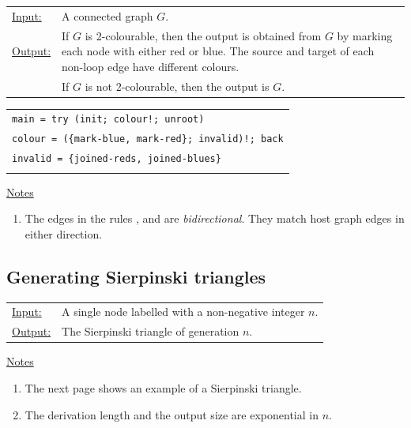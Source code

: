 \begin{tabular}{lp{10.5cm}}
\ul{Input:} & A connected graph $G$. \\
\ul{Output:} & If $G$\/ is 2-colourable, then the output is obtained from $G$\/ by marking each node with either red or blue. The source and target of each non-loop edge have different colours.\\
& If $G$\/ is not 2-colourable, then the output is $G$.
\end{tabular}

\vspace{10pt}
\begin{tabular}{|l|}
\hline 
\rule{0pt}{3ex} \hspace{0pt} \texttt{main = try (init; colour!; unroot)} \\
\hspace{2pt} \texttt{colour = (\{mark-blue, mark-red\}; invalid)!; back} \\
\hspace{2pt} \texttt{invalid = \{joined-reds, joined-blues\}} \\
 \\
\hline
\end{tabular}
\vspace{10pt}

\ul{Notes}
\begin{enumerate}
\setlength{\itemsep}{-.5ex}
\item The edges in the rules ,  and  are \emph{bidirectional}. They match host graph edges in either direction.
\end{enumerate}


\subsection{Generating Sierpinski triangles}

\begin{tabular}{lp{10.5cm}}
\ul{Input:} & A single node labelled with a non-negative integer $n$. \\
\ul{Output:} & The Sierpinski triangle of generation $n$.
\end{tabular}
  
\begin{center}

\end{center}

\ul{Notes}
\begin{enumerate}
\setlength{\itemsep}{-.5ex}
\item The next page shows an example of a Sierpinski triangle.
\item The derivation length and the output size are exponential in $n$.
\end{enumerate}

